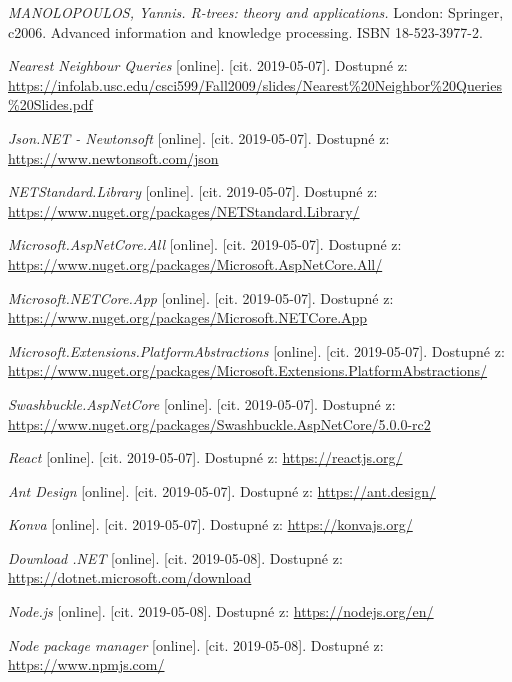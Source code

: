 \documentclass[a4paper,10pt]{article}
\begin{document}
\clearpage

\begin{thebibliography}{1}

\textit{MANOLOPOULOS, Yannis. R-trees: theory and applications.} London: Springer, c2006. Advanced information and knowledge processing. ISBN 18-523-3977-2.

\textit{Nearest Neighbour Queries} [online]. [cit. 2019-05-07]. Dostupné z: \url{https://infolab.usc.edu/csci599/Fall2009/slides/Nearest\%20Neighbor\%20Queries\%20Slides.pdf}

\textit{Json.NET - Newtonsoft} [online]. [cit. 2019-05-07]. Dostupné z: \url{https://www.newtonsoft.com/json}

\textit{NETStandard.Library} [online]. [cit. 2019-05-07]. Dostupné z: \url{https://www.nuget.org/packages/NETStandard.Library/}

\textit{Microsoft.AspNetCore.All} [online]. [cit. 2019-05-07]. Dostupné z: \url{https://www.nuget.org/packages/Microsoft.AspNetCore.All/}


\textit{Microsoft.NETCore.App} [online]. [cit. 2019-05-07]. Dostupné z: \url{https://www.nuget.org/packages/Microsoft.NETCore.App}

\textit{Microsoft.Extensions.PlatformAbstractions} [online]. [cit. 2019-05-07]. Dostupné z: \url{https://www.nuget.org/packages/Microsoft.Extensions.PlatformAbstractions/}

\textit{Swashbuckle.AspNetCore} [online]. [cit. 2019-05-07]. Dostupné z: \url{https://www.nuget.org/packages/Swashbuckle.AspNetCore/5.0.0-rc2}

\textit{React} [online]. [cit. 2019-05-07]. Dostupné z: \url{https://reactjs.org/}

\textit{Ant Design} [online]. [cit. 2019-05-07]. Dostupné z: \url{https://ant.design/}

\textit{Konva} [online]. [cit. 2019-05-07]. Dostupné z: \url{https://konvajs.org/}

\textit{Download .NET} [online]. [cit. 2019-05-08]. Dostupné z: \url{https://dotnet.microsoft.com/download}

\textit{Node.js} [online]. [cit. 2019-05-08]. Dostupné z: \url{https://nodejs.org/en/}

\textit{Node package manager} [online]. [cit. 2019-05-08]. Dostupné z: \url{https://www.npmjs.com/}


\end{thebibliography}
\end{document}
